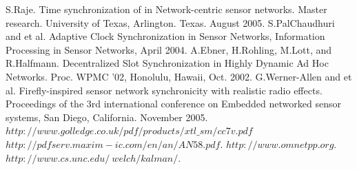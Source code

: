 \documentclass[a4paper,10pt]{report}
\begin{document}
\begin{thebibliography}{\textbf{References}}
 S.Raje. Time synchronization of in Network-centric sensor networks. Master research. University of Texas, Arlington. Texas. August 2005.
S.PalChaudhuri and et al. Adaptive Clock Synchronization in Sensor Networks, Information Processing in Sensor Networks, April 2004.
A.Ebner, H.Rohling, M.Lott, and R.Halfmann. Decentralized Slot Synchronization in Highly Dynamic Ad Hoc Networks. Proc. WPMC '02, Honolulu, Hawaii, Oct. 2002.
G.Werner-Allen and et al. Firefly-inspired sensor network synchronicity with realistic radio effects. Proceedings of the 3rd international conference on Embedded networked sensor systems, San Diego, California. November 2005.
 $http://www.golledge.co.uk/pdf/products/xtl\_sm/cc7v.pdf$
 $http://pdfserv.maxim-ic.com/en/an/AN58.pdf$.
$http://www.omnetpp.org$.
$http://www.cs.unc.edu/~welch/kalman/$.
\end{thebibliography}
\end{document}
